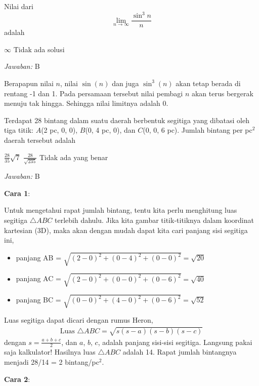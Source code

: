 \documentclass[11pt,fleqn]{exam}
\begin{document}
\begin{questions}
\question Nilai dari 
$$\lim_{n \rightarrow \infty} \frac{\sin^3{n}}{n}$$
adalah
\begin{choices}
\choice $\infty$
\choice Tidak ada solusi
\end{choices}

\textit{Jawaban: } B

Berapapun nilai $n$, nilai $\sin(n)$ dan juga $\sin^3(n)$ akan tetap berada di rentang -1 dan 1. Pada persamaan tersebut nilai pembagi $n$ akan terus bergerak menuju tak hingga. Sehingga nilai limitnya adalah 0.  


\question Terdapat 28 bintang dalam suatu daerah berbentuk segitiga yang dibatasi oleh tiga titik: $A$(2 pc, 0, 0), $B$(0, 4 pc, 0), dan $C$(0, 0, 6 pc). Jumlah bintang per pc$^2$ daerah tersebut adalah 
\begin{choices}
\choice $\frac{28}{35} \sqrt{7}$
\choice $\frac{28}{\sqrt{235}}$
\choice Tidak ada yang benar
\end{choices}

\textit{Jawaban: } B

\textbf{Cara 1}:

Untuk mengetahui rapat jumlah bintang, tentu kita perlu menghitung luas segitiga $\triangle ABC$ terlebih dahulu. Jika kita gambar titik-titiknya dalam koordinat kartesian (3D), maka akan dengan mudah dapat kita cari panjang sisi segitiga ini,
\begin{itemize}
\item panjang AB = $\sqrt{(2-0)^2 + (0-4)^2 + (0-0)^2} = \sqrt{20}$

\item panjang AC = $\sqrt{(2-0)^2 + (0-0)^2 + (0-6)^2} = \sqrt{40}$

\item panjang BC = $\sqrt{(0-0)^2 + (4-0)^2 + (0-6)^2} = \sqrt{52}$
\end{itemize}

Luas segitiga dapat dicari dengan rumus Heron,
\begin{eqnarray*}
\text{Luas } \triangle ABC = \sqrt{s(s-a)(s-b)(s-c)}
\end{eqnarray*}
dengan $s = \frac{a + b + c}{2}$, dan $a$, $b$, $c$, adalah panjang sisi-sisi segitiga. Langsung pakai saja kalkulator! Hasilnya luas $\triangle ABC$ adalah 14. Rapat jumlah bintangnya menjadi 28/14 = 2 bintang/pc$^2$.

\textbf{Cara 2}:


\end{questions}
\end{document}
